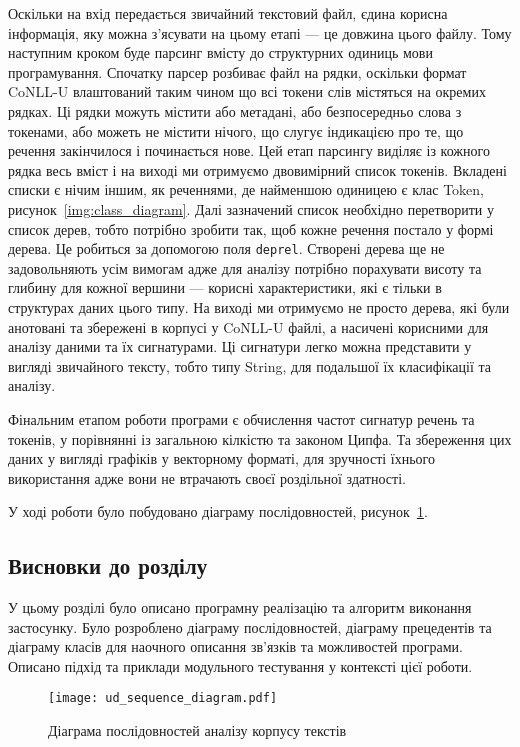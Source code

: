 Оскільки на вхід передається звичайний текстовий файл, єдина корисна інформація,
яку можна з'ясувати на цьому етапі --- це довжина цього файлу. Тому наступним кроком буде
парсинг вмісту до структурних одиниць мови програмування. Спочатку парсер розбиває
файл на рядки, оскільки формат CoNLL-U влаштований таким чином що всі токени слів
містяться на окремих рядках. Ці рядки можуть містити або метадані, або безпосередньо
слова з токенами, або можеть не містити нічого, що слугує індикацією про те, що
речення закінчилося і починається нове. Цей етап парсингу виділяє із кожного рядка
весь вміст і на виході ми отримуємо двовимірний список токенів. Вкладені
списки є нічим іншим, як реченнями, де найменшою одиницею є клас Token,
рисунок~\ref{img:class_diagram}. Далі зазначений список необхідно перетворити у список дерев,
тобто потрібно зробити так, щоб кожне речення постало у формі дерева.
Це робиться за допомогою поля \texttt{deprel}. Створені дерева ще не задовольняють
усім вимогам адже для аналізу потрібно порахувати висоту та глибину для кожної вершини --- 
корисні характеристики, які є тільки в структурах даних цього типу.
На виході ми отримуємо не просто дерева, які були анотовані та збережені в корпусі
у CoNLL-U файлі, а насичені корисними для аналізу даними та їх сигнатурами.
Ці сигнатури легко можна представити у вигляді звичайного тексту, тобто типу String, для
подальшої їх класифікації та аналізу.

Фінальним етапом роботи програми є обчислення частот сигнатур речень та токенів,
у порівнянні із загальною кілкістю та законом Ципфа. Та збереження цих даних
у вигляді графіків у векторному форматі, для зручності їхнього використання адже
вони не втрачають своєї роздільної здатності.

У ході роботи було побудовано діаграму послідовностей, рисунок~\ref{img:sequence_diagram}.

\subsection*{Висновки до розділу }
У цьому розділі було описано програмну реалізацію та алгоритм виконання
застосунку. Було розроблено діаграму послідовностей, діаграму прецедентів та
діаграму класів для наочного описання зв’язків та можливостей програми. 
Описано підхід та приклади модульного тестування у контексті цієї роботи.

\begin{figure}[H]
  \begin{center}
    \texttt{[image: ud\_sequence\_diagram.pdf]}
  \end{center}
  \caption{Діаграма послідовностей аналізу корпусу текстів}
  \label{img:sequence_diagram}
\end{figure}